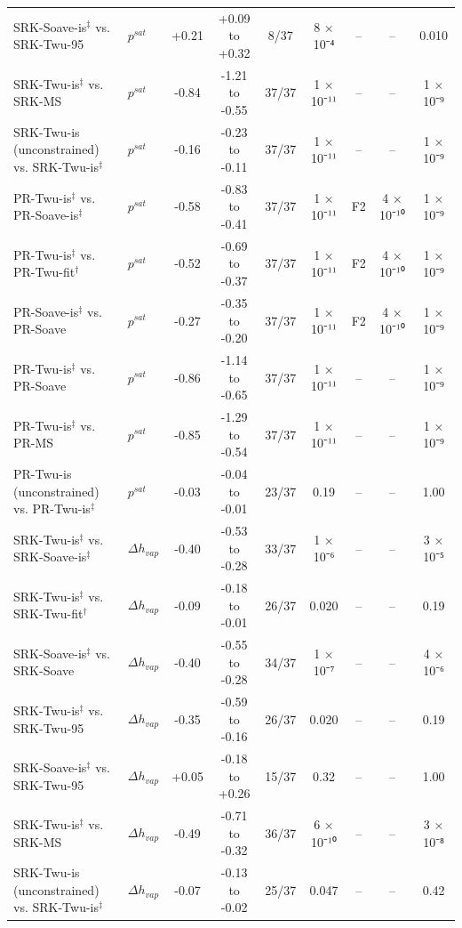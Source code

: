 \begin{table}[H]
\begin{tabular}{llccccccc}
SRK-Soave-is$^{\ddagger}$ vs. SRK-Twu-95 & $p^{sat}$ & +0.21 & +0.09 to +0.32 & 8/37 & 8 × 10⁻⁴ & -- & -- & 0.010 \\
SRK-Twu-is$^{\ddagger}$ vs. SRK-MS & $p^{sat}$ & -0.84 & -1.21 to -0.55 & 37/37 & 1 × 10⁻¹¹ & -- & -- & 1 × 10⁻⁹ \\
SRK-Twu-is (unconstrained) vs. SRK-Twu-is$^{\ddagger}$ & $p^{sat}$ & -0.16 & -0.23 to -0.11 & 37/37 & 1 × 10⁻¹¹ & -- & -- & 1 × 10⁻⁹ \\
PR-Twu-is$^{\ddagger}$ vs. PR-Soave-is$^{\ddagger}$ & $p^{sat}$ & -0.58 & -0.83 to -0.41 & 37/37 & 1 × 10⁻¹¹ & F2 & 4 × 10⁻¹⁰ & 1 × 10⁻⁹ \\
PR-Twu-is$^{\ddagger}$ vs. PR-Twu-fit$^{\dagger}$ & $p^{sat}$ & -0.52 & -0.69 to -0.37 & 37/37 & 1 × 10⁻¹¹ & F2 & 4 × 10⁻¹⁰ & 1 × 10⁻⁹ \\
PR-Soave-is$^{\ddagger}$ vs. PR-Soave & $p^{sat}$ & -0.27 & -0.35 to -0.20 & 37/37 & 1 × 10⁻¹¹ & F2 & 4 × 10⁻¹⁰ & 1 × 10⁻⁹ \\
PR-Twu-is$^{\ddagger}$ vs. PR-Soave & $p^{sat}$ & -0.86 & -1.14 to -0.65 & 37/37 & 1 × 10⁻¹¹ & -- & -- & 1 × 10⁻⁹ \\
PR-Twu-is$^{\ddagger}$ vs. PR-MS & $p^{sat}$ & -0.85 & -1.29 to -0.54 & 37/37 & 1 × 10⁻¹¹ & -- & -- & 1 × 10⁻⁹ \\
PR-Twu-is (unconstrained) vs. PR-Twu-is$^{\ddagger}$ & $p^{sat}$ & -0.03 & -0.04 to -0.01 & 23/37 & 0.19 & -- & -- & 1.00 \\
SRK-Twu-is$^{\ddagger}$ vs. SRK-Soave-is$^{\ddagger}$ & $\Delta h_{vap}$ & -0.40 & -0.53 to -0.28 & 33/37 & 1 × 10⁻⁶ & -- & -- & 3 × 10⁻⁵ \\
SRK-Twu-is$^{\ddagger}$ vs. SRK-Twu-fit$^{\dagger}$ & $\Delta h_{vap}$ & -0.09 & -0.18 to -0.01 & 26/37 & 0.020 & -- & -- & 0.19 \\
SRK-Soave-is$^{\ddagger}$ vs. SRK-Soave & $\Delta h_{vap}$ & -0.40 & -0.55 to -0.28 & 34/37 & 1 × 10⁻⁷ & -- & -- & 4 × 10⁻⁶ \\
SRK-Twu-is$^{\ddagger}$ vs. SRK-Twu-95 & $\Delta h_{vap}$ & -0.35 & -0.59 to -0.16 & 26/37 & 0.020 & -- & -- & 0.19 \\
SRK-Soave-is$^{\ddagger}$ vs. SRK-Twu-95 & $\Delta h_{vap}$ & +0.05 & -0.18 to +0.26 & 15/37 & 0.32 & -- & -- & 1.00 \\
SRK-Twu-is$^{\ddagger}$ vs. SRK-MS & $\Delta h_{vap}$ & -0.49 & -0.71 to -0.32 & 36/37 & 6 × 10⁻¹⁰ & -- & -- & 3 × 10⁻⁸ \\
SRK-Twu-is (unconstrained) vs. SRK-Twu-is$^{\ddagger}$ & $\Delta h_{vap}$ & -0.07 & -0.13 to -0.02 & 25/37 & 0.047 & -- & -- & 0.42 \\

\end{tabular}
\end{table}
